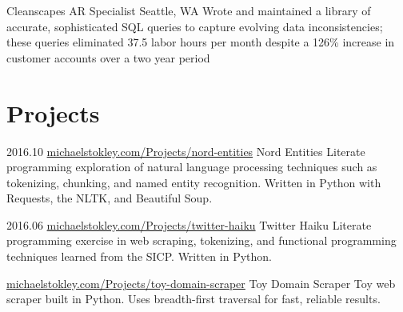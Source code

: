\documentclass[10pt,a4paper,sans]{moderncv}        %
\begin{document}
 {Cleanscapes} {AR Specialist} {} {Seattle, WA}
{Wrote and maintained a library of accurate, sophisticated SQL queries to
  capture evolving data inconsistencies; these queries eliminated 37.5 labor
  hours per month despite a 126\% increase in customer accounts over a two year
  period}

\section{Projects}

\begin{comment}
  \cventry
  {date}
  {github url}
  {name}
  {}
  {}
  {description}
\end{comment}

\cventry
{2016.10}
{\href{http://michaelstokley.com/Projects/nord-entities}{michaelstokley.com/Projects/nord-entities}}
{Nord Entities}
{}
{}
{Literate programming exploration of natural language processing techniques such
  as tokenizing, chunking, and named entity recognition. Written in Python with
  Requests, the NLTK, and Beautiful Soup.}

\cventry
{2016.06}
{\href{http://michaelstokley.com/Projects/twitter-haiku}{michaelstokley.com/Projects/twitter-haiku}}
{Twitter Haiku}
{}
{}
{Literate programming exercise in web scraping, tokenizing, and functional
  programming techniques learned from the SICP. Written in Python.}

{\href{http://michaelstokley.com/Projects/toy-domain-scraper}{michaelstokley.com/Projects/toy-domain-scraper}}
{Toy Domain Scraper}
{}
{}
{Toy web scraper built in Python. Uses breadth-first traversal for fast,
  reliable results.}

\begin{comment}
  \cventry {2016.04}
  {\href{http://github.com/TeamReciprocity/reciprocity}{github.com/TeamReciprocity/reciprocity}}
  {Reciprocity}
  {}
  {}
  {A full stack Python web application for recipe sharing and collaboration.
    Built with Django and PostgreSQL, deployed via Ansible to an AWS EC2
    instance.}
\end{comment}

\begin{comment}
  \cventry {2016.04}
  {\href{https://github.com/homequest/homequest}{github.com/homequest/homequest}}
  {HomeQuest}
  {}
  {}
  {A full-stack Python web application to gamify household chores and chore
    management. Manually implemented authorization, authentication, and
    row-level security. Built in Pyramid with a PostgreSQL database and deployed
    on Heroku.}
\end{comment}
\end{document}
